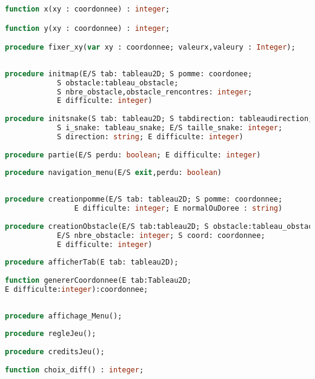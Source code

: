             \begin{lstlisting}[language=Pascal,frame=single,caption=Signatures des procédures de l'unité types]
function x(xy : coordonnee) : integer;

function y(xy : coordonnee) : integer;

procedure fixer_xy(var xy : coordonnee; valeurx,valeury : Integer);
            
            \end{lstlisting}

            \clearpage
            \begin{lstlisting}[language=Pascal,frame=single,caption=Signatures des procédures du programme principal snakee]
procedure initmap(E/S tab: tableau2D; S pomme: coordonee;
            S obstacle:tableau_obstacle; 
            S nbre_obstacle,obstacle_rencontres: integer;
            E difficulte: integer)
            
procedure initsnake(S tab: tableau2D; S tabdirection: tableaudirection;
            S i_snake: tableau_snake; E/S taille_snake: integer; 
            S direction: string; E difficulte: integer)
            
procedure partie(E/S perdu: boolean; E difficulte: integer)
            
procedure navigation_menu(E/S exit,perdu: boolean)
            
            \end{lstlisting}

            \begin{lstlisting}[language=Pascal,frame=single,caption=Signatures des procédures de l'unité création]
procedure creationpomme(E/S tab: tableau2D; S pomme: coordonnee; 
                E difficulte: integer; E normalOuDoree : string)
            
procedure creationObstacle(E/S tab:tableau2D; S obstacle:tableau_obstacle; 
            E/S nbre_obstacle: integer; S coord: coordonnee;
            E difficulte: integer)
            
procedure afficherTab(E tab: tableau2D);
            
function genererCoordonnee(E tab:Tableau2D; 
E difficulte:integer):coordonnee;
                
            \end{lstlisting}

            \begin{lstlisting}[language=Pascal,frame=single,caption=Signatures des procédures de l'unité menu]
procedure affichage_Menu();
            
procedure regleJeu();
            
procedure creditsJeu();
            
function choix_diff() : integer;
            
            \end{lstlisting}


